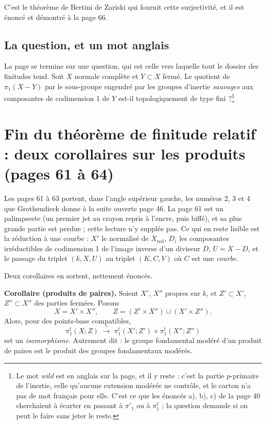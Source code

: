\documentclass[11pt,a4paper]{article}
\begin{document}
C'est le théorème de Bertini de Zariski qui fournit cette surjectivité, et il
est énoncé et démontré à la page 66.

\subsection*{La question, et un mot anglais}

La page se termine sur une question, qui est celle vers laquelle tout le
dossier des finitudes tend. Soit $X$ normale complète et $Y \subset X$ fermé.
Le quotient de $\pi_{1}(X - Y)$ par le sous-groupe engendré par les groupes
d'inertie \emph{sauvages} aux composantes de codimension 1 de $Y$ est-il
topologiquement de type fini ?\footnote{Le mot \emph{wild} est en anglais sur
la page, et il y reste : c'est la partie $p$-primaire de l'inertie, celle
qu'aucune extension modérée ne contrôle, et le carton n'a pas de mot français
pour elle. C'est ce que les énoncés a), b), c) de la page 40
cherchaient à écarter en passant à $\pi'_{1}$ ou à $\pi^{t}_{1}$ ; la question
demande si on peut le faire sans jeter le reste.}

\section*{Fin du théorème de finitude relatif : deux corollaires sur les produits (pages 61 à 64)}

Les pages 61 à 63 portent, dans l'angle supérieur gauche, les numéros 2, 3 et 4
que Grothendieck donne à la suite ouverte page 46. La page 61 est un
palimpseste (un premier jet au crayon repris à l'encre, puis biffé), et sa
plus grande partie est perdue ; cette lecture n'y supplée pas. Ce qui en reste
lisible est la réduction à une courbe : $X'$ le normalisé de $X_{\mathrm{red}}$,
$D_{i}$ les composantes irréductibles de codimension 1 de l'image inverse d'un
diviseur $D$, $U = X - D$, et le passage du triplet $(k, X, U)$ au triplet
$(K, C, V)$ où $C$ est une \emph{courbe}.

Deux corollaires en sortent, nettement énoncés.

\textbf{Corollaire (produits de paires).} Soient $X'$, $X''$ propres sur $k$,
et $Z' \subset X'$, $Z'' \subset X''$ des parties fermées. Posons
\[
  X = X' \times X'' , \qquad
  Z = (Z' \times X'') \cup (X' \times Z'') .
\]
Alors, pour des points-base compatibles,
\[
  \pi^{t}_{1}(X ; Z) \;\xrightarrow{\ \sim\ }\;
  \pi^{t}_{1}(X' ; Z') \times \pi^{t}_{1}(X'' ; Z'')
\]
est un \emph{isomorphisme}. Autrement dit : le groupe fondamental modéré d'un
produit de paires est le produit des groupes fondamentaux modérés.
\end{document}
